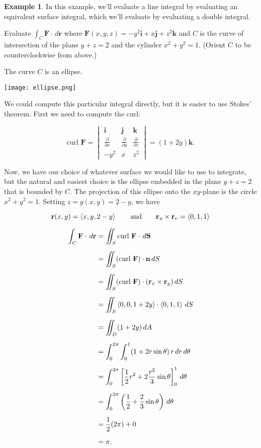 \documentclass[11pt,oneside,english]{amsart}
\theoremstyle{definition}
\newtheorem*{example}{Example}
\newcommand{\aspace}{\hspace{7mm}\text{and}\hspace{7mm}}
\newcommand{\pp}[2]{\frac{\partial{#1}}{\partial{#2}}}
\def\<#1>{\mathinner{\langle#1\rangle}}
\begin{document}
\begin{example}
In this example, we'll evaluate a line integral by evaluating an equivalent surface integral, which we'll evaluate by evaluating a double integral.

Evaluate $\int_C\mathbf{F}\cdot\,d\mathbf{r}$ where $\mathbf{F}(x,y,z)=-y^2\mathbf{i}+x\mathbf{j}+z^2\mathbf{k}$ and $C$ is the curve of intersection of the plane $y+z=2$ and the cylinder $x^2+y^2=1$. (Orient $C$ to be counterclockwise from above.)

The curve $C$ is an ellipse.

\begin{center}
\texttt{[image: ellipse.png]}
\end{center}

We could compute this particular integral directly, but it is easier to use Stokes' theorem. First we need to compute the curl:

\[
\text{curl }\mathbf{F}=\begin{vmatrix}\mathbf{i}&\mathbf{j}&\mathbf{k}\\ \pp{}{x} &\pp{}{y}&\pp{}{z} \\ -y^2 & x & z^2\end{vmatrix}=(1+2y)\mathbf{k}.
\]

Now, we have our choice of whatever surface we would like to use to integrate, but the natural and easiest choice is the ellipse embedded in the plane $y+z=2$ that is bounded by $C$. The projection of this ellipse onto the $xy$-plane is the circle $x^2+y^2=1$. Setting $z=g(x,y)=2-y$, we have

\[
\mathbf{r}(x,y)=\<x,y,2-y>\aspace \mathbf{r}_u\times\mathbf{r}_v=\<0,1,1>
\]

\begin{align*}
\int_C\mathbf{F}\cdot\,d\mathbf{r}&=\iint_S\text{curl }\mathbf{F}\cdot\,d\mathbf{S}\\[2mm]
&=\iint_S(\text{curl }\mathbf{F})\cdot\mathbf{n}\,dS\\[2mm]
&=\iint_S(\text{curl }\mathbf{F})\cdot(\mathbf{r}_x\times\mathbf{r}_y)\,dS\\[2mm]
&=\iint_S\<0,0,1+2y>\cdot\<0,1,1>\,dS\\[2mm]
&=\iint_D(1+2y)\,dA\\[2mm]
&=\int_0^{2\pi}\int_0^1(1+2r\sin\theta)\,r\,dr\,d\theta\\[2mm]
&=\int_0^{2\pi}\left[\frac{1}{2}r^2+2\frac{r^2}{3}\sin\theta\right]_0^1\,d\theta\\[2mm]
&=\int_0^{2\pi}\left(\frac{1}{2}+\frac{2}{3}\sin\theta\right)\,d\theta\\[2mm]
&=\frac{1}{2}(2\pi)+0\\[2mm]
&=\pi.
\end{align*}
\end{example}
\end{document}
